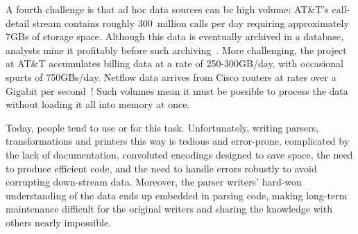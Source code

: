 A fourth challenge is that ad hoc data sources can be high volume:
AT\&T's call-detail stream contains roughly 300~million calls per day
requiring approximately 7GBs of storage space. Although this data is
eventually archived in a database, analysts mine it profitably before
such archiving~\cite{kdd98,kdd99}. More challenging, the \ningaui{}
project at AT\&T accumulates billing data at a rate of 250-300GB/day,
with occasional spurts of 750GBs/day. Netflow data arrives from Cisco
routers at rates over a Gigabit per second~\cite{gigascope}! Such
volumes mean it must be possible to process the data without loading
it all into memory at once.

Today, people tend to use \C{} or \perl{} for this task.
Unfortunately, writing parsers, transformations and printers this way
is tedious and error-prone, complicated by the lack of documentation,
convoluted encodings designed to save space, the need to produce
efficient code, and the need to handle errors robustly to avoid
corrupting down-stream data.  Moreover, the parser writers' hard-won
understanding of the data ends up embedded in parsing code, making
long-term maintenance difficult for the original writers and sharing
the knowledge with others nearly impossible.




